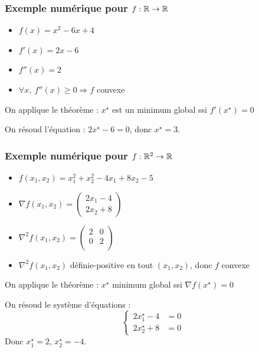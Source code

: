 \begin{frame}
  \frametitle{Exemple numérique pour $f:{\mathbb{R}} \rightarrow {\ensuremath\mathbb{R}}$}

  \begin{itemize}
  \item $f(x) = x^2 - 6x + 4$\\
  \item $f'(x) = 2x - 6$\\
  \item $f''(x) = 2$ \\ 
  \item $\forall x, \ f''(x) \geq 0 \Rightarrow f$ convexe
  \end{itemize}
  
  On applique le théorème : $x^\star$ est un minimum global ssi $f'(x^\star) = 0$ 
  
  On résoud l'équation : $2x^\star - 6 = 0$, donc $x^\star = 3$.
  
\end{frame}

\begin{frame}
  \frametitle{Exemple numérique pour $f:{\mathbb{R}}^2 \rightarrow {\ensuremath\mathbb{R}}$}

  \begin{itemize}
  \item $f(x_1,x_2) = x_1^2 + x_2^2 - 4x_1 + 8x_2 - 5$
  \item ${\nabla f}(x_1,x_2) = \left(\begin{array}{l}
    2x_1 - 4\\
    2x_2 + 8
  \end{array}
    \right)$
  \item $\nabla^2f(x_1,x_2) =\left(\begin{array}{cc}
    2 & 0 \\
    0 & 2 \\
  \end{array}
    \right)$
  \item $\nabla^2f(x_1,x_2)$ définie-positive en tout $(x_1,x_2)$, 
  donc $f$ convexe
  \end{itemize}

  On applique le théorème : $x^\star$ minimum global ssi ${\nabla f}(x^\star) = 0$

  On résoud le système d'équations : 
  \[
  \left\{
  \begin{array}{ll}
    2x^\star_1 - 4 & = 0\\
    2x^\star_2 + 8 & = 0
  \end{array}
  \right.
  \]
  Donc $x^\star_1 = 2$, $x^\star_2 = -4$.
  
\end{frame}


